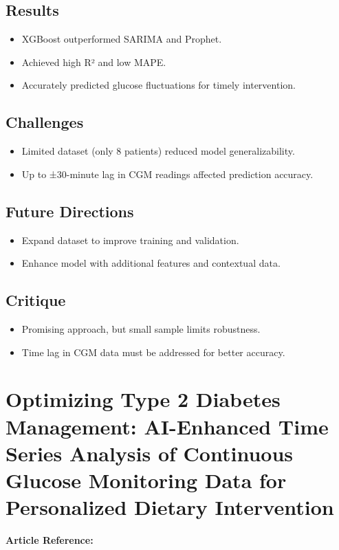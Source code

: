 \subsection*{Results}
\begin{itemize}
    \item XGBoost outperformed SARIMA and Prophet.
    \item Achieved high R² and low MAPE.
    \item Accurately predicted glucose fluctuations for timely intervention.
\end{itemize}

\subsection*{Challenges}
\begin{itemize}
    \item Limited dataset (only 8 patients) reduced model generalizability.
    \item Up to ±30-minute lag in CGM readings affected prediction accuracy.
\end{itemize}

\subsection*{Future Directions}
\begin{itemize}
    \item Expand dataset to improve training and validation.
    \item Enhance model with additional features and contextual data.
\end{itemize}

\subsection*{Critique}
\begin{itemize}
    \item Promising approach, but small sample limits robustness.
    \item Time lag in CGM data must be addressed for better accuracy.
\end{itemize}

\section{Optimizing Type 2 Diabetes Management: AI-Enhanced Time Series Analysis of Continuous Glucose Monitoring Data for Personalized Dietary Intervention}
\textbf{Article Reference:} \cite{article_9}

